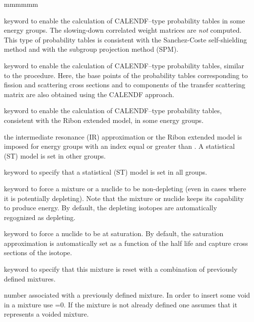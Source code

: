 \begin{ListeDeDescription}{mmmmmm}
\item[\moc{PT}] keyword to enable the calculation of CALENDF--type probability tables in some energy groups. The
slowing-down correlated weight matrices are {\sl not} computed. This type of probability tables is consistent
with the Sanchez-Coste self-shielding method and with the subgroup projection method (SPM).\cite{SPM09}

\item[\moc{PTMC}] keyword to enable the calculation of CALENDF--type probability tables, similar to the 
procedure. Here, the base points of the probability tables corresponding
to fission and scattering cross sections and to components of the transfer scattering matrix are also obtained using the CALENDF approach.

\item[\moc{PTSL}] keyword to enable the calculation of CALENDF--type probability tables, consistent
with the Ribon extended model, in some energy groups.

\item[\dusa{nir}]  the intermediate resonance (IR) approximation or the Ribon extended
model is imposed for energy groups with an index equal or greater than .
A statistical (ST) model is set in other groups.

\item[\moc{NONE}] keyword to specify that a statistical (ST) model is set in
all groups.

\item[\moc{NOEV}] keyword to force a mixture or a nuclide to be non-depleting (even in
cases where it is potentially depleting). Note that the mixture or nuclide keeps its
capability to produce energy. By default, the depleting isotopes are
automatically regognized as depleting.

\item[\moc{SAT}] keyword to force a nuclide to be at saturation. By default, the saturation approximation is
automatically set as a function of the half life and capture cross sections of the isotope.

\item[\moc{COMB}]  keyword to specify that this mixture is reset with a
combination of previously defined mixtures.

\item[\dusa{mati}]  number associated with a previously defined mixture. In
order to insert some void in a mixture use =0. If the mixture is not
already defined one assumes that it represents a voided mixture.


\end{ListeDeDescription}
